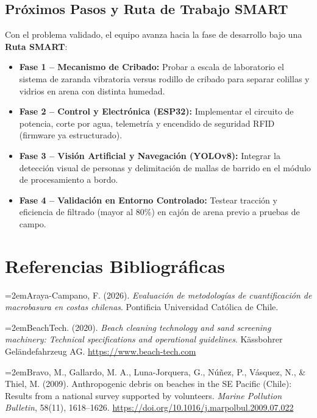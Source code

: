\documentclass[12pt,letterpaper]{article}
\newcommand{\hangapa}{\par\noindent\hangindent=2em\hangafter=1}
\begin{document}
\subsection{Próximos Pasos y Ruta de Trabajo SMART}
Con el problema validado, el equipo avanza hacia la fase de desarrollo bajo una \textbf{Ruta SMART}:
\begin{itemize}[leftmargin=*, noitemsep, topsep=0pt]
    \item \textbf{Fase 1 -- Mecanismo de Cribado:} Probar a escala de laboratorio el sistema de zaranda vibratoria versus rodillo de cribado para separar colillas y vidrios en arena con distinta humedad.
    \item \textbf{Fase 2 -- Control y Electrónica (ESP32):} Implementar el circuito de potencia, corte por agua, telemetría y encendido de seguridad RFID (firmware ya estructurado).
    \item \textbf{Fase 3 -- Visión Artificial y Navegación (YOLOv8):} Integrar la detección visual de personas y delimitación de mallas de barrido en el módulo de procesamiento a bordo.
    \item \textbf{Fase 4 -- Validación en Entorno Controlado:} Testear tracción y eficiencia de filtrado (mayor al 80\%) en cajón de arena previo a pruebas de campo.
\end{itemize}

\clearpage

\section{Referencias Bibliográficas}

\hangapa Araya-Campano, F. (2026). \textit{Evaluación de metodologías de cuantificación de macrobasura en costas chilenas}. Pontificia Universidad Católica de Chile.

\hangapa BeachTech. (2020). \textit{Beach cleaning technology and sand screening machinery: Technical specifications and operational guidelines}. Kässbohrer Geländefahrzeug AG. \url{https://www.beach-tech.com}

\hangapa Bravo, M., Gallardo, M. A., Luna-Jorquera, G., Núñez, P., Vásquez, N., \& Thiel, M. (2009). Anthropogenic debris on beaches in the SE Pacific (Chile): Results from a national survey supported by volunteers. \textit{Marine Pollution Bulletin}, 58(11), 1618--1626. \url{https://doi.org/10.1016/j.marpolbul.2009.07.022}
\end{document}
